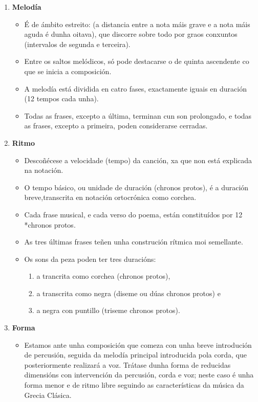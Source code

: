 \begin{ejercicio}
\begin{enumerate}[1.-]
    \item \textbf{Melodía} \par
        \begin{itemize}
            \item 
            É de ámbito estreito: (a distancia entre a nota máis grave e a nota máis aguda é dunha oitava), que discorre sobre todo por graos conxuntos (intervalos de segunda e terceira).
            \item 
            Entre os saltos melódicos, só pode destacarse o de quinta ascendente co que se inicia a composición. 
            \item 
            A melodía está dividida en catro fases, exactamente iguais en duración (12 tempos cada unha). 
            \item 
            Todas as frases, excepto a última, terminan cun son prolongado, e todas as frases, excepto a primeira, poden considerarse cerradas.
        \end{itemize}
        
    \item \textbf{Ritmo} \par
    \begin{itemize}
        \item 
        Descoñécese a velocidade (tempo) da canción, xa que non está explicada na notación.
        \item 
        O tempo básico, ou unidade de duración (chronos protos), é a duración breve,transcrita en notación ortocrónica como corchea.
        \item
        Cada frase musical, e cada verso do poema, están constituídos por 12 *chronos protos. 
        \item 
        As tres últimas frases teñen unha construción rítmica moi semellante.
        \item
        Os sons da peza poden ter tres duracións: \begin{enumerate}
            \item 
            a trancrita como corchea (chronos protos),
            \item a transcrita como negra (diseme ou dúas chronos protos) e
            \item a negra con puntillo (triseme chronos protos).
            \end{enumerate}
    \end{itemize}

    \item \textbf{Forma} \par
        \begin{itemize}
            \item 
            Estamos ante unha composición que comeza con unha breve introdución de percusión, seguida da melodía principal introducida pola corda, que posteriormente realizará a voz. 
            Trátase dunha forma de reducidas dimensións con intervención da percusión, corda e voz; neste caso é unha forma menor e de ritmo libre seguindo as características da música da Grecia Clásica.
            \par
            

\end{itemize}
\end{enumerate}
\end{ejercicio}
